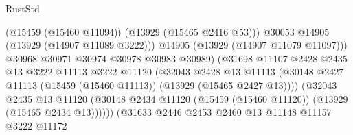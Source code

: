 \begin{lexlean}{RustStd}
\begin{coremodule}
                                                (@15459 (@15460 @11094))
                                                (@13929 (@15465 @2416 @53)))
                                              @30053
                                              @14905
                                              (@13929 (@14907 @11089 @3222)))
                                            @14905
                                            (@13929 (@14907 @11079 @11097)))
                                          @30968
                                          @30971
                                          @30974
                                          @30978
                                          @30983
                                          @30989)
                                        (@31698
                                          @11107
                                          @2428
                                          @2435
                                          @13
                                          @3222
                                          @11113
                                          @3222
                                          @11120
                                          (@32043
                                            @2428
                                            @13
                                            @11113
                                            (@30148
                                              @2427
                                              @11113
                                              (@15459 (@15460 @11113))
                                              (@13929 (@15465 @2427 @13))))
                                          (@32043
                                            @2435
                                            @13
                                            @11120
                                            (@30148
                                              @2434
                                              @11120
                                              (@15459 (@15460 @11120))
                                              (@13929 (@15465 @2434 @13))))))
                                      (@31633
                                        @2446
                                        @2453
                                        @2460
                                        @13
                                        @11148
                                        @11157
                                        @3222
                                        @11172

\end{coremodule}
\end{lexlean}
